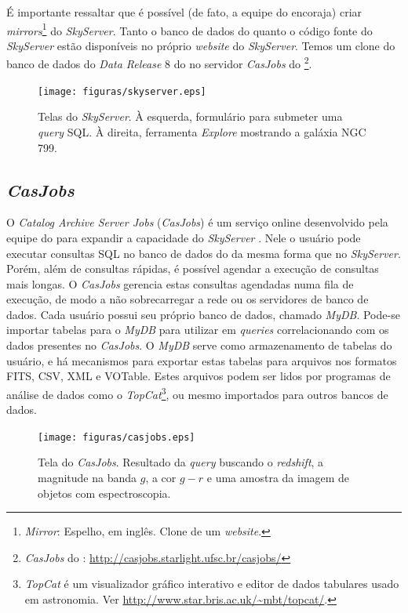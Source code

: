 É importante ressaltar que é possível (de fato, a equipe do \SDSS encoraja)
criar {\em mirrors}\footnote{{\em Mirror}: Espelho, em inglês. Clone de um {\em
website}.} do {\em SkyServer}. Tanto o banco de dados do \SDSS quanto o código
fonte do {\em SkyServer} estão disponíveis no próprio {\em website} do {\em
SkyServer}. Temos um clone do banco de dados do {\em Data Release} 8 do \SDSS no
servidor {\em CasJobs} do \starlight \footnote{{\em CasJobs} do \starlight:
\url{http://casjobs.starlight.ufsc.br/casjobs/}}.

\begin{figure}
	\texttt{[image: figuras/skyserver.eps]}
	\caption[Telas do {\em SkyServer}.]
	{Telas do {\em SkyServer}. À esquerda, formulário para submeter uma {\em
	query} SQL. À direita, ferramenta {\em Explore} mostrando a galáxia NGC 799.}
	\label{fig:TelaDoSkyServer}
\end{figure}

\subsection{{\em CasJobs}}
\label{sec:CrossMatch:SDSS:CasJobs}

O {\em Catalog Archive Server Jobs} ({\em CasJobs}) é um serviço online
desenvolvido pela equipe do \SDSS para expandir a capacidade do {\em SkyServer}
\citep{Li2008}. Nele o usuário pode executar consultas SQL no banco de dados do
\SDSS da mesma forma que no {\em SkyServer}. Porém, além de consultas rápidas, é
possível agendar a execução de consultas mais longas. O {\em CasJobs} gerencia
estas consultas agendadas numa fila de execução, de modo a não sobrecarregar a
rede ou os servidores de banco de dados. Cada usuário possui seu próprio banco
de dados, chamado {\em MyDB}. Pode-se importar tabelas para o {\em MyDB} para
utilizar em {\em queries} correlacionando com os dados presentes no {\em
CasJobs}. O {\em MyDB} serve como armazenamento de tabelas do usuário, e há
mecanismos para exportar estas tabelas para arquivos nos formatos FITS, CSV, XML
e VOTable. Estes arquivos podem ser lidos por programas de análise de dados como
o {\em TopCat}\footnote{{\em TopCat} é um visualizador gráfico interativo e
editor de dados tabulares usado em astronomia. Ver
\url{http://www.star.bris.ac.uk/~mbt/topcat/}.}, ou mesmo importados para outros
bancos de dados.

\begin{figure}
	\texttt{[image: figuras/casjobs.eps]}
	\caption[Tela do {\em CasJobs}.]
	{Tela do {\em CasJobs}. Resultado da {\em query} buscando o {\em redshift}, a
	magnitude na banda $g$, a cor $g-r$ e uma amostra da imagem de objetos com
	espectroscopia.}
	\label{fig:CasJobs}
\end{figure}

